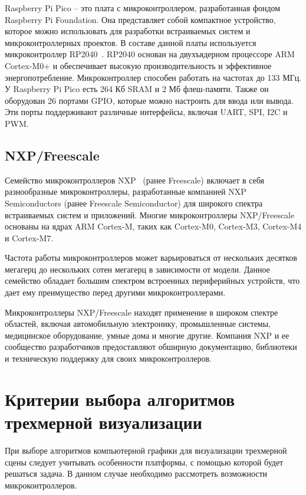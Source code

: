 Raspberry Pi Pico -- это плата с микроконтроллером, разработанная фондом Raspberry Pi Foundation. 
Она представляет собой компактное устройство, которое можно использовать для разработки встраиваемых систем и микроконтроллерных проектов. 
В составе данной платы используется микроконтроллер RP2040~\cite{rp2040}. 
RP2040 основан на двухъядерном процессоре ARM Cortex-M0+ и обеспечивает высокую производительность и эффективное энергопотребление. 
Микроконтроллер способен работать на частотах до 133 МГц. 
У Raspberry Pi Pico есть 264 Кб SRAM и 2 Мб флеш-памяти. 
Также он оборудован 26 портами GPIO, которые можно настроить для ввода или вывода. Эти порты поддерживают различные интерфейсы, включая UART, SPI, I2C и PWM.

\subsection{NXP/Freescale}

Семейство микроконтроллеров NXP~\cite{nxp} (ранее Freescale) включает в себя разнообразные микроконтроллеры, разработанные компанией NXP Semiconductors (ранее Freescale Semiconductor) для широкого спектра встраиваемых систем и приложений. 
Многие микроконтроллеры NXP/Freescale основаны на ядрах ARM Cortex-M, таких как Cortex-M0, Cortex-M3, Cortex-M4 и Cortex-M7.

Частота работы микроконтроллеров может варьироваться от нескольких десятков мегагерц до нескольких сотен мегагерц в зависимости от модели. 
Данное семейство обладает большим спектром встроенных периферийных устройств, что дает ему преимущество перед другими микроконтроллерами.

Микроконтроллеры NXP/Freescale находят применение в широком спектре областей, включая автомобильную электронику, промышленные системы, медицинское оборудование, умные дома и многие другие. 
Компания NXP и ее сообщество разработчиков предоставляют обширную документацию, библиотеки и техническую поддержку для своих микроконтроллеров.

\section{Критерии выбора алгоритмов трехмерной визуализации}
При выборе алгоритмов компьютерной графики для визуализации трехмерной сцены следует учитывать особенности платформы, с помощью которой будет решаться задача. 
В данном случае необходимо рассмотреть возможности микроконтроллеров.

